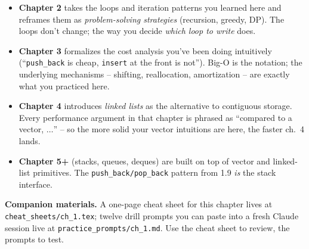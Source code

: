 \documentclass[11pt]{article}
\begin{document}
\begin{notebox}
\begin{itemize}
    \item \textbf{Chapter 2} takes the loops and iteration patterns you
    learned here and reframes them as \emph{problem-solving strategies}
    (recursion, greedy, DP). The loops don't change; the way you decide
    \emph{which loop to write} does.
    \item \textbf{Chapter 3} formalizes the cost analysis you've been doing
    intuitively (``\texttt{push\_back} is cheap, \texttt{insert} at the front
    is not''). Big-O is the notation; the underlying mechanisms -- shifting,
    reallocation, amortization -- are exactly what you practiced here.
    \item \textbf{Chapter 4} introduces \emph{linked lists} as the alternative
    to contiguous storage. Every performance argument in that chapter is
    phrased as ``compared to a vector, $\ldots$'' -- so the more solid your
    vector intuitions are here, the faster ch.~4 lands.
    \item \textbf{Chapter 5+} (stacks, queues, deques) are built on top of
    vector and linked-list primitives. The \texttt{push\_back/pop\_back}
    pattern from 1.9 \emph{is} the stack interface.
\end{itemize}
\end{notebox}

\textbf{Companion materials.} A one-page cheat sheet for this chapter lives
at \texttt{cheat\_sheets/ch\_1.tex}; twelve drill prompts you can paste into
a fresh Claude session live at \texttt{practice\_prompts/ch\_1.md}. Use the
cheat sheet to review, the prompts to test.
\end{document}
